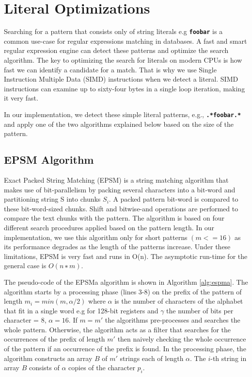 \section{Literal Optimizations}\label{section:simdopt}
Searching for a pattern that consists only of string literals e.g \texttt{\textbf{foobar}} is a common use-case for regular expressions matching in databases. A fast and smart regular expression engine can detect these patterns and optimize the search algorithm. The key to optimizing the search for literals on modern CPUs is how fast we can identify a candidate for a match. That is why we use Single Instruction Multiple Data (SIMD) instructions when we detect a literal. SIMD instructions can examine up to sixty-four bytes in a single loop iteration, making it very fast.

In our implementation, we detect these simple literal patterns, e.g., \texttt{\textbf{.*foobar.*}} and apply one of the two algorithms explained below based on the size of the pattern.

\subsection{EPSM Algorithm}
Exact Packed String Matching (EPSM) \cite{epsm} is a string matching algorithm that makes use of bit-parallelism by packing several characters into a bit-word and partitioning string S into chunks $S_i$. A packed pattern bit-word is compared to these bit-word-sized chunks. Shift and bitwise-and operations are performed to compare the text chunks with the pattern. The algorithm is based on four different search procedures applied based on the pattern length. In our implementation, we use this algorithm only for short patterns $(m <= 16)$ as its performance degrades as the length of the patterns increase. Under these limitations, EPSM is very fast and runs in O(n). The asymptotic run-time for the general case is $O(n ∗ m)$.

The pseudo-code of the EPSMa algorithm is shown in Algorithm \ref{alg:espma}. The algorithm starts by a processing phase (lines 3-8) on the prefix of the pattern of length $m_i = min(m, \alpha/2)$ where $\alpha$ is the number of characters of the alphabet that fit in a single word e.g for 128-bit registers and $\gamma$ the number of bits per character = 8, $\alpha = 16$. If $m = m'$ the algorithms pre-processes and searches the whole pattern. Otherwise, the algorithm acts as a filter that searches for the occurrences of the prefix of length $m'$ then naively checking the whole occurrence of the pattern if an occurrence of the prefix is found. In the processing phase, the algorithm  constructs an array $B$ of $m'$ strings each of length $\alpha$. The $i$-th string in array $B$ consists of $\alpha$ copies of the character $p_i$.

